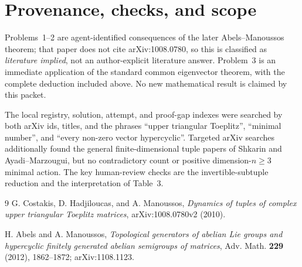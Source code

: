 \documentclass[11pt]{article}
\begin{document}
\section{Provenance, checks, and scope}

Problems~1--2 are agent-identified consequences of the later
Abels--Manoussos theorem; that paper does not cite arXiv:1008.0780, so this is
classified as \emph{literature implied}, not an author-explicit literature
answer.  Problem~3 is an immediate application of the standard common
eigenvector theorem, with the complete deduction included above.  No new
mathematical result is claimed by this packet.

The local registry, solution, attempt, and proof-gap indexes were searched by
both arXiv ids, titles, and the phrases ``upper triangular Toeplitz'',
``minimal number'', and ``every non-zero vector hypercyclic''.  Targeted arXiv
searches additionally found the general finite-dimensional tuple papers of
Shkarin and Ayadi--Marzougui, but no contradictory count or positive
dimension-$n\ge3$ minimal action.  The key human-review checks are the
invertible-subtuple reduction and the interpretation of Table~3.

\begin{thebibliography}{9}
G. Costakis, D. Hadjiloucas, and A. Manoussos,
\emph{Dynamics of tuples of complex upper triangular Toeplitz matrices},
arXiv:1008.0780v2 (2010).

H. Abels and A. Manoussos,
\emph{Topological generators of abelian Lie groups and hypercyclic finitely
generated abelian semigroups of matrices},
Adv. Math. \textbf{229} (2012), 1862--1872;
arXiv:1108.1123.
\end{thebibliography}
\end{document}
